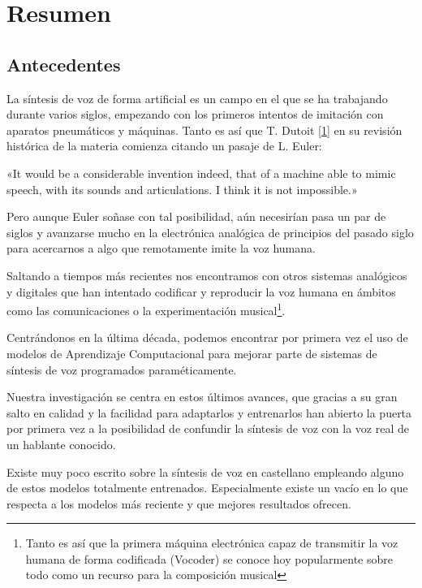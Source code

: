 \section{Resumen}

\subsection{Antecedentes}

La síntesis de voz de forma artificial es un campo en el que se ha trabajando durante varios siglos, empezando con los primeros intentos de imitación con aparatos pneumáticos y máquinas. Tanto es así que T. Dutoit \hyperref[RI_1]{[1]} en su revisión histórica de la materia comienza citando un pasaje de L. Euler:

\begin{displayquote}
«It would be a considerable invention indeed, that of a machine able to mimic speech, with its sounds and articulations. I think it is not impossible.»
\end{displayquote}

Pero aunque Euler soñase con tal posibilidad, aún necesirían pasa un par de siglos y avanzarse mucho en la electrónica analógica de principios del pasado siglo para acercarnos a algo que remotamente imite la voz humana.

Saltando a tiempos más recientes nos encontramos con otros sistemas analógicos y digitales que han intentado codificar y reproducir la voz humana en ámbitos como las comunicaciones o la experimentación musical\footnote{Tanto es así que la primera máquina electrónica capaz de transmitir la voz humana de forma codificada (Vocoder) se conoce hoy  popularmente sobre todo como un recurso para la composición musical}. 

Centrándonos en la última década, podemos encontrar por primera vez el uso de modelos de Aprendizaje Computacional para mejorar parte de sistemas de síntesis de voz programados paraméticamente. 

Nuestra investigación se centra en estos últimos avances, que gracias a su gran salto en calidad y la facilidad para adaptarlos y entrenarlos han abierto la puerta por primera vez a la posibilidad de confundir la síntesis de voz con la voz real de un hablante conocido.

Existe muy poco escrito sobre la síntesis de voz en castellano empleando alguno de estos modelos totalmente entrenados. Especialmente existe un vacío en lo que respecta a los modelos más reciente y que mejores resultados ofrecen. 


